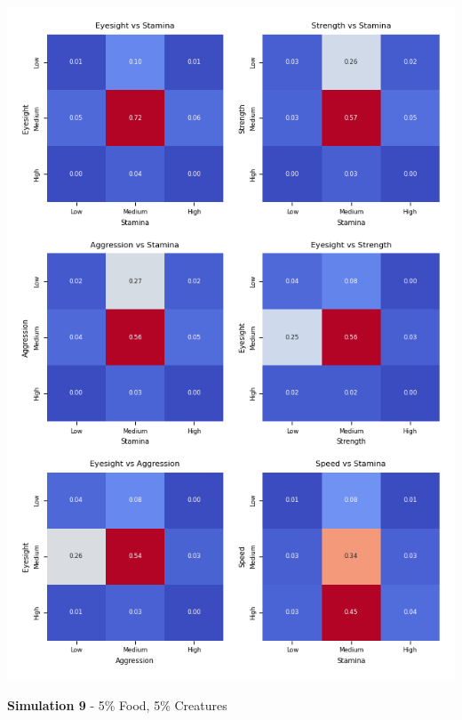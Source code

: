 \documentclass{article}
\begin{document}
\begin{center}
    \includegraphics[scale=0.9]{tests/8_confusion_matrices.png}
\end{center}
\textbf{Simulation 9} - 5\% Food, 5\% Creatures
\end{document}
